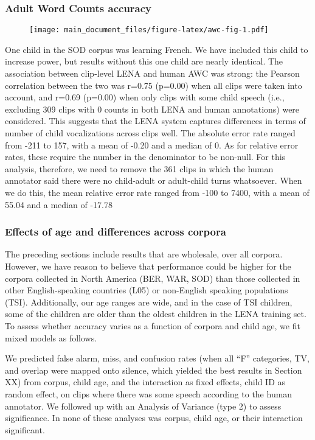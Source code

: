 \documentclass[english,floatsintext,man]{apa6}
\begin{document}
\subsubsection{Adult Word Counts
accuracy}\label{adult-word-counts-accuracy}

\begin{figure}
\centering
\texttt{[image: main\_document\_files/figure-latex/awc-fig-1.pdf]}
\caption{}
\end{figure}

One child in the SOD corpus was learning French. We have included this
child to increase power, but results without this one child are nearly
identical. The association between clip-level LENA and human AWC was
strong: the Pearson correlation between the two was r=0.75 (p=0.00) when
all clips were taken into account, and r=0.69 (p=0.00) when only clips
with some child speech (i.e., excluding 309 clips with 0 counts in both
LENA and human annotations) were considered. This suggests that the LENA
system captures differences in terms of number of child vocalizations
across clips well. The absolute error rate ranged from -211 to 157, with
a mean of -0.20 and a median of 0. As for relative error rates, these
require the number in the denominator to be non-null. For this analysis,
therefore, we need to remove the 361 clips in which the human annotator
said there were no child-adult or adult-child turns whatsoever. When we
do this, the mean relative error rate ranged from -100 to 7400, with a
mean of 55.04 and a median of -17.78

\subsubsection{Effects of age and differences across
corpora}\label{effects-of-age-and-differences-across-corpora}

The preceding sections include results that are wholesale, over all
corpora. However, we have reason to believe that performance could be
higher for the corpora collected in North America (BER, WAR, SOD) than
those collected in other English-speaking countries (L05) or non-English
speaking populations (TSI). Additionally, our age ranges are wide, and
in the case of TSI children, some of the children are older than the
oldest children in the LENA training set. To assess whether accuracy
varies as a function of corpora and child age, we fit mixed models as
follows.

We predicted false alarm, miss, and confusion rates (when all
\enquote{F} categories, TV, and overlap were mapped onto silence, which
yielded the best results in Section XX) from corpus, child age, and the
interaction as fixed effects, child ID as random effect, on clips where
there was some speech according to the human annotator. We followed up
with an Analysis of Variance (type 2) to assess significance. In none of
these analyses was corpus, child age, or their interaction significant.
\end{document}
